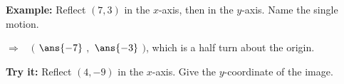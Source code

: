 \documentclass[12pt]{article}
\begin{document}
\begin{examplebox}
\textbf{Example:} \quad Reflect $(7, 3)$ in the $x$-axis, then in the $y$-axis. Name the single motion.

$\Rightarrow\quad ($ $\ans{-7}$ $,$ $\ans{-3}$ $)$, which is a half turn about the origin.
\end{examplebox}

\begin{tryitbox}
\textbf{Try it:} \quad Reflect $(4, -9)$ in the $x$-axis. Give the $y$-coordinate of the image.\\[2pt]
\end{tryitbox}
\end{document}
